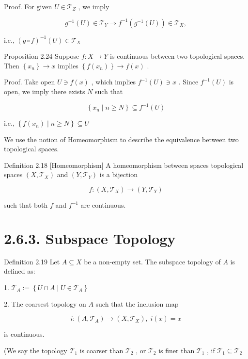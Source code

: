 Proof. For given \(U \in  {\mathcal{T}}_{Z}\) , we imply

\[
{g}^{-1}\left( U\right)  \in  {\mathcal{T}}_{Y} \Rightarrow  {f}^{-1}\left( {{g}^{-1}\left( U\right) }\right)  \in  {\mathcal{T}}_{X},
\]

i.e., \({\left( g \circ  f\right) }^{-1}\left( U\right)  \in  {\mathcal{T}}_{X}\)

Proposition 2.24 Suppose \(f : X \rightarrow  Y\) is continuous between two topological spaces. Then \(\left\{  {x}_{n}\right\}   \rightarrow  x\) implies \(\left\{  {f\left( {x}_{n}\right) }\right\}   \rightarrow  f\left( x\right)\) .

Proof. Take open \(U \ni  f\left( x\right)\) , which implies \({f}^{-1}\left( U\right)  \ni  x\) . Since \({f}^{-1}\left( U\right)\) is open, we imply there exists \(N\) such that

\[
\left\{  {{x}_{n} \mid  n \geq  N}\right\}   \subseteq  {f}^{-1}\left( U\right)
\]

i.e., \(\left\{  {f\left( {x}_{n}\right)  \mid  n \geq  N}\right\}   \subseteq  U\)

We use the notion of Homeomorphism to describe the equivalence between two topological spaces.

Definition 2.18 [Homeomorphism] A homeomorphism between spaces topological spaces \(\left( {X,{\mathcal{T}}_{X}}\right)\) and \(\left( {Y,{\mathcal{T}}_{Y}}\right)\) is a bijection

\[
f : \left( {X,{\mathcal{T}}_{X}}\right)  \rightarrow  \left( {Y,{\mathcal{T}}_{Y}}\right)
\]

such that both \(f\) and \({f}^{-1}\) are continuous.

\section*{2.6.3. Subspace Topology}

Definition 2.19 Let \(A \subseteq  X\) be a non-empty set. The subspace topology of \(A\) is defined as:

1. \({\mathcal{T}}_{A} \mathrel{\text{ := }} \left\{  {U \cap  A \mid  U \in  {\mathcal{T}}_{A}}\right\}\)

2. The coarsest topology on \(A\) such that the inclusion map

\[
i : \left( {A,{\mathcal{T}}_{A}}\right)  \rightarrow  \left( {X,{\mathcal{T}}_{X}}\right) ,\;i\left( x\right)  = x
\]

is continuous.

(We say the topology \({\mathcal{T}}_{1}\) is coarser than \({\mathcal{T}}_{2}\) , or \({\mathcal{T}}_{2}\) is finer than \({\mathcal{T}}_{1}\) , if \({\mathcal{T}}_{1} \subseteq  {\mathcal{T}}_{2}\)

